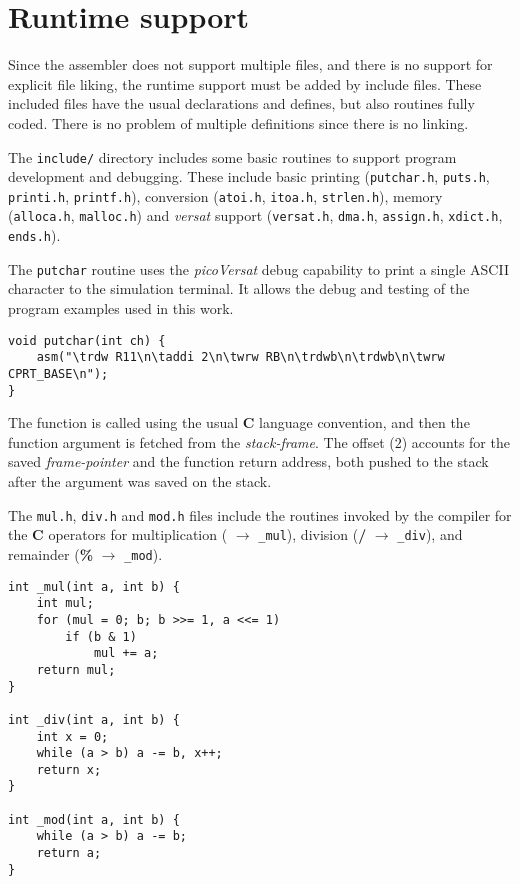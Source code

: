 \section{Runtime support}

Since the assembler does not support multiple files,
and there is no support for explicit file liking,
the runtime support must be added by include files.
These included files have the usual declarations
and defines, but also routines fully coded.
There is no problem of multiple definitions since
there is no linking.

The {\tt include/} directory includes some basic
routines to support program development and debugging.
These include basic printing ({\tt putchar.h}, {\tt puts.h},
{\tt printi.h}, {\tt printf.h}),
conversion ({\tt atoi.h}, {\tt itoa.h}, {\tt strlen.h}),
memory ({\tt alloca.h}, {\tt malloc.h}) and {\it versat}
support ({\tt versat.h}, {\tt dma.h}, {\tt assign.h},
{\tt xdict.h}, {\tt ends.h}).

The {\tt putchar} routine uses the {\it picoVersat} debug capability to
print a single {\sc ASCII} character to the simulation terminal.
It allows the debug and testing of the program examples used in this work.
\begin{Verbatim}[baselinestretch=1.2]
void putchar(int ch) {
    asm("\trdw R11\n\taddi 2\n\twrw RB\n\trdwb\n\trdwb\n\twrw CPRT_BASE\n");
}
\end{Verbatim}

The function is called using the usual {\bf C} language convention, and then
the function argument is fetched from the {\it stack-frame}.
The offset ($2$) accounts for the saved {\it frame-pointer} and the function
return address, both pushed to the stack after the argument was saved on the
stack.

The {\tt mul.h}, {\tt div.h} and {\tt mod.h} files
include the routines invoked by the compiler
for the {\bf C} operators for
multiplication ({\bf *} $\rightarrow$ {\tt \_mul}),
division ({\bf /} $\rightarrow$ {\tt \_div}), and
remainder ({\bf \%} $\rightarrow$ {\tt \_mod}).
\begin{Verbatim}[baselinestretch=1.0]
int _mul(int a, int b) {
    int mul;
    for (mul = 0; b; b >>= 1, a <<= 1)
        if (b & 1)
            mul += a;
    return mul;
}

int _div(int a, int b) {
    int x = 0;
    while (a > b) a -= b, x++;
    return x;
}

int _mod(int a, int b) {
    while (a > b) a -= b;
    return a;
}
\end{Verbatim}

